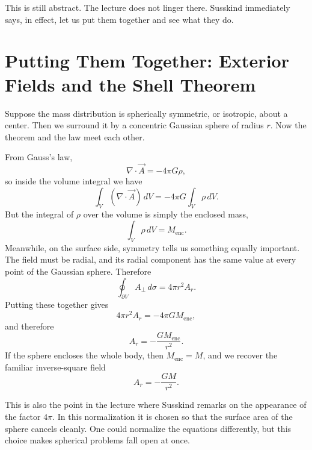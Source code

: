 This is still abstract. The lecture does not linger there. Susskind immediately says, in effect, let us put them together and see what they do.

\section{Putting Them Together: Exterior Fields and the Shell Theorem}

Suppose the mass distribution is spherically symmetric, or isotropic, about a center. Then we surround it by a concentric Gaussian sphere of radius $r$. Now the theorem and the law meet each other.

From Gauss's law,
\begin{equation}
\nabla\cdot\vec A = -4\pi G\rho,
\end{equation}
so inside the volume integral we have
\begin{equation}
\int_V (\nabla\cdot\vec A)\,dV
=
-4\pi G\int_V \rho\,dV.
\end{equation}
But the integral of $\rho$ over the volume is simply the enclosed mass,
\begin{equation}
\int_V \rho\,dV = M_{\mathrm{enc}}.
\end{equation}
Meanwhile, on the surface side, symmetry tells us something equally important. The field must be radial, and its radial component has the same value at every point of the Gaussian sphere. Therefore
\begin{equation}
\oint_{\partial V} A_\perp\,d\sigma = 4\pi r^2 A_r.
\end{equation}
Putting these together gives
\begin{equation}
4\pi r^2 A_r = -4\pi G M_{\mathrm{enc}},
\end{equation}
and therefore
\begin{equation}
A_r = -\frac{G M_{\mathrm{enc}}}{r^2}.
\end{equation}
If the sphere encloses the whole body, then $M_{\mathrm{enc}}=M$, and we recover the familiar inverse-square field
\begin{equation}
A_r = -\frac{GM}{r^2}.
\end{equation}

This is also the point in the lecture where Susskind remarks on the appearance of the factor $4\pi$. In this normalization it is chosen so that the surface area of the sphere cancels cleanly. One could normalize the equations differently, but this choice makes spherical problems fall open at once.

